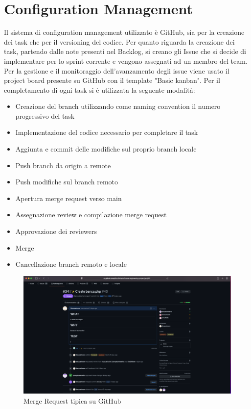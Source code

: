 \documentclass[12pt]{article}
\begin{document}
\section{Configuration Management}
Il sistema di configuration management utilizzato è GitHub, sia per la \newline 
creazione dei task che per il versioning del codice. \newline
Per quanto riguarda la creazione dei task, partendo dalle note presenti nel Backlog, si creano gli Issue che si decide di implementare per lo sprint corrente e vengono assegnati ad un membro del team. \newline
Per la gestione e il monitoraggio dell'avanzamento degli issue viene usato il project board presente su GitHub con il template "Basic kanban". \newline
Per il completamento di ogni task si è utilizzata la seguente modalità:
\bigskip
\bigskip
\begin{itemize}
  \item Creazione del branch utilizzando come naming convention il numero progressivo del task
  \item Implementazione del codice necessario per completare il task
  \item Aggiunta e commit delle modifiche sul proprio branch locale
  \item Push branch da origin a remote 
  \item Push modifiche sul branch remoto
  \item Apertura merge request verso main 
  \item Assegnazione review e compilazione merge request
  \item Approvazione dei reviewers
  \item Merge
  \item Cancellazione branch remoto e locale
\end{itemize}
\begin{figure}[ht]
  \includegraphics[width=1.2\textwidth]{mergeRequest.png}
  \caption{Merge Request tipica su GitHub}
\end{figure}
\end{document}
